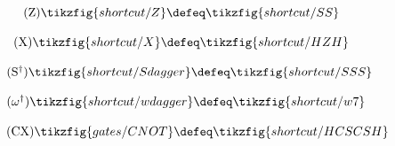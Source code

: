 \begin{figure}[H]
{{\begin{minipage}{0.975\textwidth}
            \begin{minipage}{0.24\textwidth}
                \centering
                \begin{equation}
                    \tag{Z}\label{cs-Z}
                    \tikzfig{shortcut/Z} \defeq \tikzfig{shortcut/SS}
                \end{equation}
            \end{minipage}
            \begin{minipage}{0.37\textwidth}
                \centering
                \begin{equation}
                    \tag{X}\label{cs-X}
                    \tikzfig{shortcut/X} \defeq \tikzfig{shortcut/HZH}
                \end{equation}
            \end{minipage}
            \begin{minipage}{0.25\textwidth}
                \centering
                \begin{equation}
                    \tag{S$^\dagger$}\label{cs-Sdagger}
                    \tikzfig{shortcut/Sdagger} \defeq \tikzfig{shortcut/SSS}
                \end{equation}
            \end{minipage}\vspace{-0.6em}
            \begin{minipage}{0.24\textwidth}
                \centering
                \begin{equation}
                    \tag{$\omega^\dagger$}\label{cs-wdagger}
                    \tikzfig{shortcut/wdagger} \defeq \tikzfig{shortcut/w7}
                \end{equation}
            \end{minipage}
            \begin{minipage}{0.4\textwidth}
                \centering
                \begin{equation}
                    \tag{CX}\label{cs-CNOT}
                    \tikzfig{gates/CNOT} \defeq \tikzfig{shortcut/HCSCSH}
                \end{equation}
            \end{minipage}
            \end{minipage}}
        }
\end{figure}
